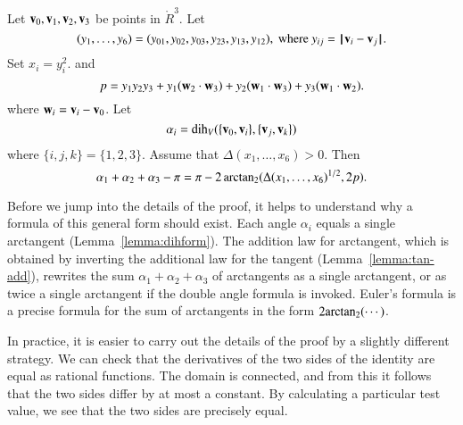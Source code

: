\begin{lemma}\label{lemma:euler} %
Let ${\mathbf v}_0,{\mathbf v}_1,{\mathbf v}_2,{\mathbf v}_3$ be points in $\ring{R}^3$. 
Let 
\begin{displaymath}(y_1,\ldots,y_6)
  =(y_{01},y_{02},y_{03},y_{23},y_{13},y_{12}), \text{ where }
  y_{ij}=\norm{\v_i}{\v_j}.\end{displaymath} Set $x_i = y_i^2$.  and
\begin{displaymath}
p = y_1 y_2 y_3 + y_1 ({\mathbf w}_2\cdot {\mathbf w}_3) + y_2 ({\mathbf w}_1\cdot {\mathbf w}_3) + y_3
({\mathbf w}_1\cdot {\mathbf w}_2).
\end{displaymath}
%
where ${\mathbf w}_i = {\mathbf v}_i- {\mathbf v}_0$.  Let \begin{displaymath}\alpha_i
  =\operatorname{dih}_V(\{{\mathbf v}_0,{\mathbf v}_i\},\{{\mathbf v}_j,{\mathbf v}_k\})\end{displaymath}
where $\{i,j,k\}=\{1,2,3\}$.
Assume that $\Delta(x_1,\ldots,x_6)>0$. 
Then
\begin{displaymath}
\alpha_1+\alpha_2+\alpha_3 - \pi
= {\pi} - 2\,{\operatorname{arctan_2}}({\Delta(x_1,\ldots,x_6)^{1/2}},{2 p}).
\end{displaymath}
\end{lemma}
%


Before we jump into the details of the proof, it helps to understand
why a formula of this general form should exist.  
Each angle $\alpha_i$ equals a single arctangent (Lemma~\ref{lemma:dihform}).
The addition law for arctangent, which is obtained by inverting the additional law for
the tangent (Lemma~\ref{lemma:tan-add}),
rewrites the sum $\alpha_1+\alpha_2+\alpha_3$
of arctangents as a single arctangent, or as twice a single arctangent if
the double angle formula is invoked.  Euler's formula is a precise formula for the
sum of arctangents in the form $2{\operatorname{arctan_2}}(\cdots)$.

In practice, it is easier to carry out the details of the proof by a
slightly different strategy.  We can check that the derivatives of the
two sides of the identity are equal as rational functions.  The domain
is connected, and from this it follows that the two sides differ by at
most a constant.  By calculating a particular test value, we see that
the two sides are precisely equal.



